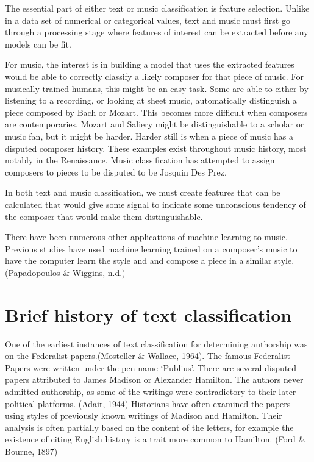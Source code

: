 \documentclass[12pt,twoside]{reedthesis}
\theoremstyle{definition}
\theoremstyle{definition}
\theoremstyle{definition}
\theoremstyle{remark}
\begin{document}
The essential part of either text or music classification is feature
selection. Unlike in a data set of numerical or categorical values, text
and music must first go through a processing stage where features of
interest can be extracted before any models can be fit.

For music, the interest is in building a model that uses the extracted
features would be able to correctly classify a likely composer for that
piece of music. For musically trained humans, this might be an easy
task. Some are able to either by listening to a recording, or looking at
sheet music, automatically distinguish a piece composed by Bach or
Mozart. This becomes more difficult when composers are contemporaries.
Mozart and Saliery might be distinguishable to a scholar or music fan,
but it might be harder. Harder still is when a piece of music has a
disputed composer history. These examples exist throughout music
history, most notably in the Renaissance. Music classification has
attempted to assign composers to pieces to be disputed to be Josquin Des
Prez.

In both text and music classification, we must create features that can
be calculated that would give some signal to indicate some unconscious
tendency of the composer that would make them distinguishable.

There have been numerous other applications of machine learning to
music. Previous studies have used machine learning trained on a
composer's music to have the computer learn the style and and compose a
piece in a similar style. (Papadopoulos \& Wiggins, n.d.)

\section{Brief history of text
classification}\label{brief-history-of-text-classification}

One of the earliest instances of text classification for determining
authorship was on the Federalist papers.(Mosteller \& Wallace, 1964).
The famous Federalist Papers were written under the pen name `Publius'.
There are several disputed papers attributed to James Madison or
Alexander Hamilton. The authors never admitted authorship, as some of
the writings were contradictory to their later political platforms.
(Adair, 1944) Historians have often examined the papers using styles of
previously known writings of Madison and Hamilton. Their analysis is
often partially based on the content of the letters, for example the
existence of citing English history is a trait more common to Hamilton.
(Ford \& Bourne, 1897)
\end{document}
